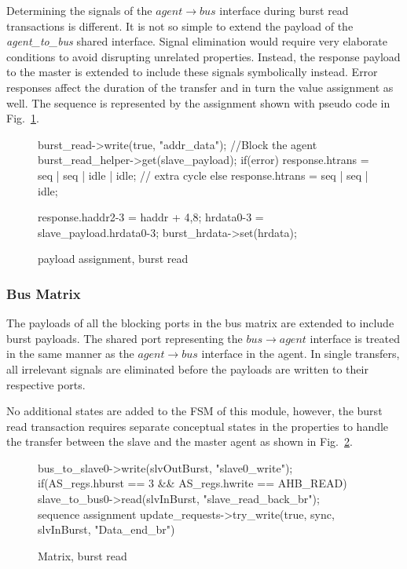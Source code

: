 Determining the signals of the $agent\rightarrow bus$ interface during burst read transactions is different. It is not so simple to extend the payload of the \textit{agent\_to\_bus} shared interface. Signal elimination would require very elaborate conditions to avoid disrupting unrelated properties. Instead, the response payload to the master is extended to include these signals symbolically instead. Error responses affect the duration of the transfer and in turn the value assignment as well. The sequence is represented by the assignment shown with pseudo code in Fig.~\ref{fig:burst-read-sequence}.   
\newpage
\begin{figure}[h!]
\begin{C++}
burst_read->write(true, "addr_data"); //Block the agent
burst_read_helper->get(slave_payload);
if(error) 
response.htrans = seq | seq | idle | idle; // extra cycle
else
response.htrans = seq | seq | idle; 

response.haddr2-3 = haddr + 4,8;   
hrdata0-3 = slave_payload.hrdata0-3;
burst_hrdata->set(hrdata); 
\end{C++}
\caption{payload assignment, burst read}
\label{fig:burst-read-sequence}
\end{figure}

\subsubsection{Bus Matrix}
The payloads of all the blocking ports in the bus matrix are extended to include burst payloads. The shared port representing the $bus\rightarrow agent$ interface is treated in the same manner as the $agent\rightarrow bus$ interface in the agent. In single transfers, all irrelevant signals are eliminated before the payloads are written to their respective ports. \par
No additional states are added to the FSM of this module, however, the burst read transaction requires separate conceptual states in the properties to handle the transfer between the slave and the master agent as shown in Fig.~\ref{fig:burst-read-matrix}.
\begin{figure}[h!]
\begin{C++}
bus_to_slave0->write(slvOutBurst, "slave0_write");
 if(AS_regs.hburst == 3 && AS_regs.hwrite == AHB_READ){
 slave_to_bus0->read(slvInBurst, "slave_read_back_br");
    \\sequence assignment
 update_requests->try_write(true, sync, slvInBurst, "Data_end_br")
 }
\end{C++}
\caption{Matrix, burst read}
\label{fig:burst-read-matrix}
\end{figure}

